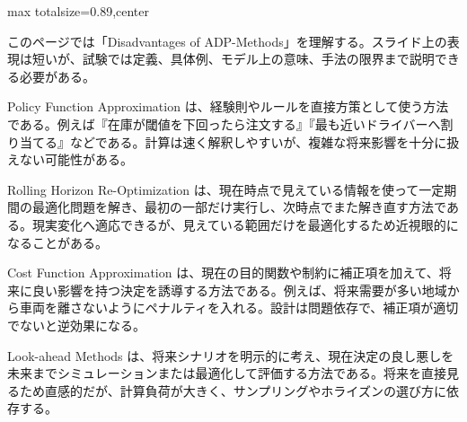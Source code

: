 \begin{minipage}[t]{0.58\textwidth}
\begin{adjustbox}{max totalsize={\textwidth}{0.89\textheight},center}
\begin{minipage}{\textwidth}\scriptsize
{}このページでは「Disadvantages of ADP-Methods」を理解する。スライド上の表現は短いが、試験では定義、具体例、モデル上の意味、手法の限界まで説明できる必要がある。\par
Policy Function Approximation は、経験則やルールを直接方策として使う方法である。例えば『在庫が閾値を下回ったら注文する』『最も近いドライバーへ割り当てる』などである。計算は速く解釈しやすいが、複雑な将来影響を十分に扱えない可能性がある。\par
Rolling Horizon Re-Optimization は、現在時点で見えている情報を使って一定期間の最適化問題を解き、最初の一部だけ実行し、次時点でまた解き直す方法である。現実変化へ適応できるが、見えている範囲だけを最適化するため近視眼的になることがある。\par
Cost Function Approximation は、現在の目的関数や制約に補正項を加えて、将来に良い影響を持つ決定を誘導する方法である。例えば、将来需要が多い地域から車両を離さないようにペナルティを入れる。設計は問題依存で、補正項が適切でないと逆効果になる。\par
Look-ahead Methods は、将来シナリオを明示的に考え、現在決定の良し悪しを未来までシミュレーションまたは最適化して評価する方法である。将来を直接見るため直感的だが、計算負荷が大きく、サンプリングやホライズンの選び方に依存する。\par

\end{minipage}
\end{adjustbox}
\end{minipage}

